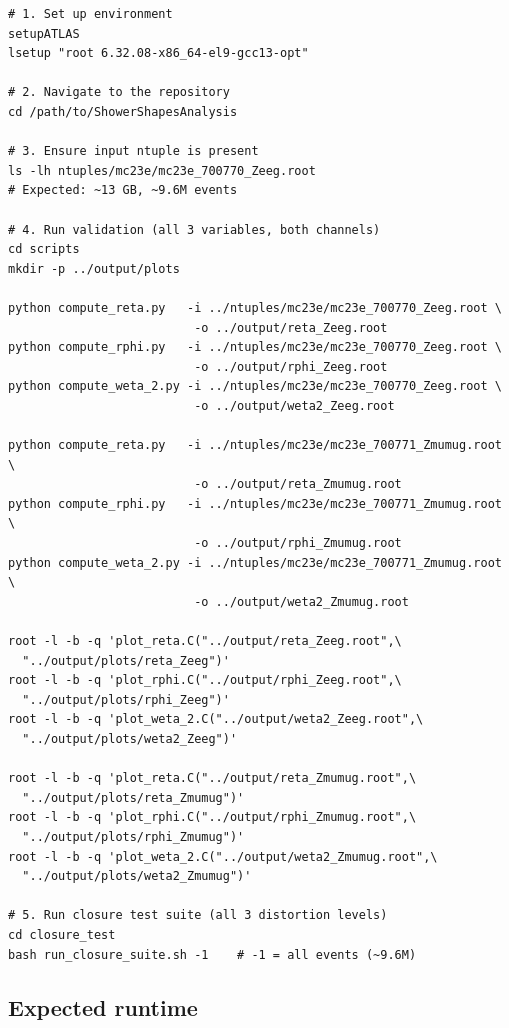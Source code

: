 \documentclass[12pt,a4paper]{article}
\begin{document}
\begin{lstlisting}
# 1. Set up environment
setupATLAS
lsetup "root 6.32.08-x86_64-el9-gcc13-opt"

# 2. Navigate to the repository
cd /path/to/ShowerShapesAnalysis

# 3. Ensure input ntuple is present
ls -lh ntuples/mc23e/mc23e_700770_Zeeg.root
# Expected: ~13 GB, ~9.6M events

# 4. Run validation (all 3 variables, both channels)
cd scripts
mkdir -p ../output/plots

python compute_reta.py   -i ../ntuples/mc23e/mc23e_700770_Zeeg.root \
                          -o ../output/reta_Zeeg.root
python compute_rphi.py   -i ../ntuples/mc23e/mc23e_700770_Zeeg.root \
                          -o ../output/rphi_Zeeg.root
python compute_weta_2.py -i ../ntuples/mc23e/mc23e_700770_Zeeg.root \
                          -o ../output/weta2_Zeeg.root

python compute_reta.py   -i ../ntuples/mc23e/mc23e_700771_Zmumug.root \
                          -o ../output/reta_Zmumug.root
python compute_rphi.py   -i ../ntuples/mc23e/mc23e_700771_Zmumug.root \
                          -o ../output/rphi_Zmumug.root
python compute_weta_2.py -i ../ntuples/mc23e/mc23e_700771_Zmumug.root \
                          -o ../output/weta2_Zmumug.root

root -l -b -q 'plot_reta.C("../output/reta_Zeeg.root",\
  "../output/plots/reta_Zeeg")'
root -l -b -q 'plot_rphi.C("../output/rphi_Zeeg.root",\
  "../output/plots/rphi_Zeeg")'
root -l -b -q 'plot_weta_2.C("../output/weta2_Zeeg.root",\
  "../output/plots/weta2_Zeeg")'

root -l -b -q 'plot_reta.C("../output/reta_Zmumug.root",\
  "../output/plots/reta_Zmumug")'
root -l -b -q 'plot_rphi.C("../output/rphi_Zmumug.root",\
  "../output/plots/rphi_Zmumug")'
root -l -b -q 'plot_weta_2.C("../output/weta2_Zmumug.root",\
  "../output/plots/weta2_Zmumug")'

# 5. Run closure test suite (all 3 distortion levels)
cd closure_test
bash run_closure_suite.sh -1    # -1 = all events (~9.6M)
\end{lstlisting}

\subsection{Expected runtime}
\end{document}
